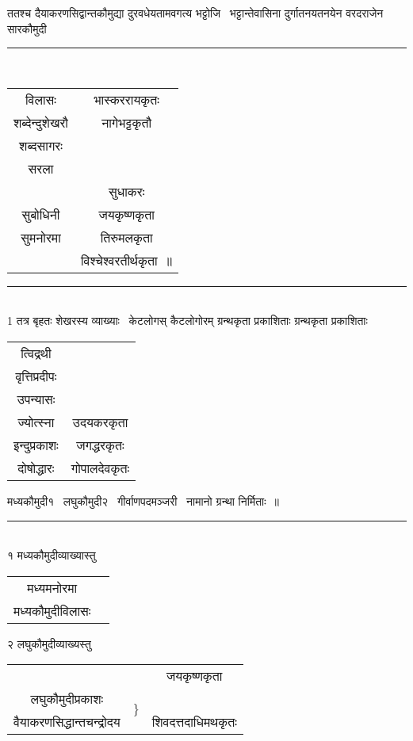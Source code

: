 \documentclass[11pt, openany]{book}
\begin{document}
\begin{multicols}{2}
ततश्च दैयाकरणसिद्वान्तकौमुद्या दुरवधेयतामवगत्य भट्टोजि \textendash\ भट्टान्तेवासिना दुर्गातनयतनयेन वरदराजेन सारकौमुदी \textendash\

\noindent
\rule{1\linewidth}{0.5pt}\\

\begin{tabular}{c c}
विलासः &भास्कररायकृतः\\
शब्देन्दुशेखरौ& नागेभट्टकृतौ \\
शब्दसागरः & \\
सरला & \\
& सुधाकरः\\
सुबोधिनी & जयकृष्णकृता\\
सुमनोरमा &तिरुमलकृता \\
& विश्चेश्वरतीर्थकृता~॥
\end{tabular}

\noindent
\rule{1\linewidth}{0.5pt}\\

1 तत्र बृहतः शेखरस्य व्याख्याः \textendash\ केटलोगस् कैटलोगोरम् ग्रन्थकृता प्रकाशिताः ग्रन्थकृता प्रकाशिताः \textendash\

\begin{tabular}{c c}
त्विद्रथी & \\
वृत्तिप्रदीपः& \\
उपन्यासः & \\
ज्योत्स्ना & उदयकरकृता \\
इन्दुप्रकाशः & जगद्धरकृतः \\
दोषोद्धारः & गोपालदेवकृतः
\end{tabular}

\columnbreak

\noindent
मध्यकौमुदी१ \textendash\ लघुकौमुदी२ \textendash\ गीर्वाणपदमञ्जरी \textendash\ नामानो ग्रन्था निर्मिताः~॥ 

\noindent
\rule{1\linewidth}{0.5pt}\\

१ मध्यकौमुदीव्याख्यास्तु \textendash\ 

\begin{tabular}{c c}
मध्यमनोरमा& \\
मध्यकौमुदीविलासः& 
\end{tabular}

२ लघुकौमुदीव्याख्यस्तु \textendash\ 

\begin{tabular}{c c c}
& & जयकृष्णकृता\\
लघुकौमुदीप्रकाशः & \multirow{2}{*}{$\big\}$}& \\
वैयाकरणसिद्धान्तचन्द्रोदय & &शिवदत्तदाधिमथकृतः
\end{tabular}


\end{multicols}
\end{document}
